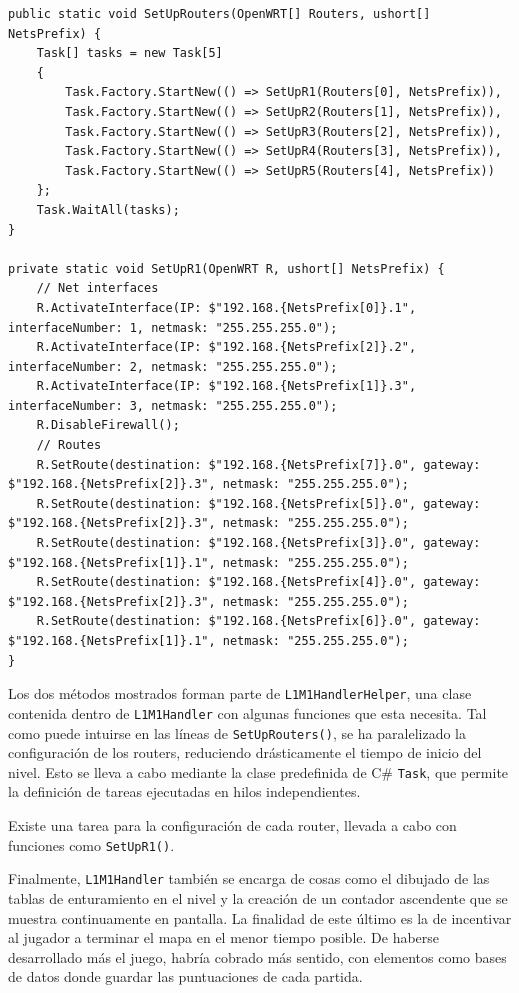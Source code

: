 \begin{itemize}
\begin{lstlisting}[language={[Sharp]C}, caption={\texttt{L1M1HandlerHelper.SetUpRouters()} y \texttt{L1M1HandlerHelper.SetUpRouters()}}, label={L1M1HandlerHelper_code}]
public static void SetUpRouters(OpenWRT[] Routers, ushort[] NetsPrefix) {
    Task[] tasks = new Task[5]
    {
        Task.Factory.StartNew(() => SetUpR1(Routers[0], NetsPrefix)),
        Task.Factory.StartNew(() => SetUpR2(Routers[1], NetsPrefix)),
        Task.Factory.StartNew(() => SetUpR3(Routers[2], NetsPrefix)),
        Task.Factory.StartNew(() => SetUpR4(Routers[3], NetsPrefix)),
        Task.Factory.StartNew(() => SetUpR5(Routers[4], NetsPrefix))
    };
    Task.WaitAll(tasks);
}

private static void SetUpR1(OpenWRT R, ushort[] NetsPrefix) {
    // Net interfaces
    R.ActivateInterface(IP: $"192.168.{NetsPrefix[0]}.1", interfaceNumber: 1, netmask: "255.255.255.0");
    R.ActivateInterface(IP: $"192.168.{NetsPrefix[2]}.2", interfaceNumber: 2, netmask: "255.255.255.0");
    R.ActivateInterface(IP: $"192.168.{NetsPrefix[1]}.3", interfaceNumber: 3, netmask: "255.255.255.0");
    R.DisableFirewall();
    // Routes
    R.SetRoute(destination: $"192.168.{NetsPrefix[7]}.0", gateway: $"192.168.{NetsPrefix[2]}.3", netmask: "255.255.255.0");
    R.SetRoute(destination: $"192.168.{NetsPrefix[5]}.0", gateway: $"192.168.{NetsPrefix[2]}.3", netmask: "255.255.255.0");
    R.SetRoute(destination: $"192.168.{NetsPrefix[3]}.0", gateway: $"192.168.{NetsPrefix[1]}.1", netmask: "255.255.255.0");
    R.SetRoute(destination: $"192.168.{NetsPrefix[4]}.0", gateway: $"192.168.{NetsPrefix[2]}.3", netmask: "255.255.255.0");
    R.SetRoute(destination: $"192.168.{NetsPrefix[6]}.0", gateway: $"192.168.{NetsPrefix[1]}.1", netmask: "255.255.255.0");
}
\end{lstlisting}

Los dos métodos mostrados forman parte de \texttt{L1M1HandlerHelper}, una clase contenida dentro de \texttt{L1M1Handler} con algunas funciones que esta necesita. Tal como puede intuirse en las líneas de \texttt{SetUpRouters()}, se ha paralelizado la configuración de los routers, reduciendo drásticamente el tiempo de inicio del nivel. Esto se lleva a cabo mediante la clase predefinida de C\# \texttt{Task}, que permite la definición de tareas ejecutadas en hilos independientes.

Existe una tarea para la configuración de cada router, llevada a cabo con funciones como \texttt{SetUpR1()}.

Finalmente, \texttt{L1M1Handler} también se encarga de cosas como el dibujado de las tablas de enturamiento en el nivel y la creación de un contador ascendente que se muestra continuamente en pantalla. La finalidad de este último es la de incentivar al jugador a terminar el mapa en el menor tiempo posible. De haberse desarrollado más el juego, habría cobrado más sentido, con elementos como bases de datos donde guardar las puntuaciones de cada partida.


\end{itemize}
